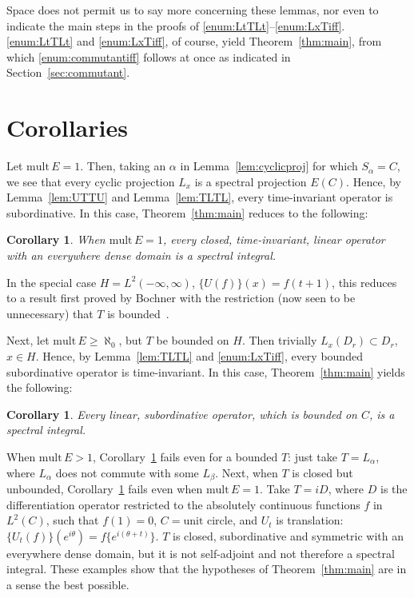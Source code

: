 \documentclass[12pt]{article}
\newtheorem{corollary}[theorem]{Corollary}
\theoremstyle{definition}
\begin{document}
Space does not permit us to say more concerning these lemmas, nor even to indicate the main steps in the proofs of \ref{enum:LtTLt}--\ref{enum:LxTiff}. \ref{enum:LtTLt} and \ref{enum:LxTiff}, of course, yield Theorem~\ref{thm:main}, from which \ref{enum:commutantiff} follows at once as indicated in Section~\ref{sec:commutant}.

\section{Corollaries}

Let $\mathrm{mult}\, E = 1$. Then, taking an $\alpha$ in Lemma~\ref{lem:cyclicproj} for which $S_\alpha = C$, we see that every cyclic projection $L_x$ is a spectral projection $E(C)$. Hence, by Lemma~\ref{lem:UTTU} and Lemma~\ref{lem:TLTL}, every time-invariant operator is subordinative. In this case, Theorem~\ref{thm:main} reduces to the following:

\begin{corollary}\label{cor:mult1}
When $\mathrm{mult}\, E = 1$, every closed, time-invariant, linear operator with an everywhere dense domain is a spectral integral.
\end{corollary}

In the special case $H = L^2(-\infty, \infty)$, $\{U(f)\}(x) = f(t+1)$, this reduces to a result first proved by Bochner with the restriction (now seen to be unnecessary) that $T$ is bounded~\cite{bochner1929}.

Next, let $\mathrm{mult}\, E \geq \aleph_0$, but $T$ be bounded on $H$. Then trivially $L_x(D_r) \subset D_r$, $x \in H$. Hence, by Lemma~\ref{lem:TLTL} and \ref{enum:LxTiff}, every bounded subordinative operator is time-invariant. In this case, Theorem~\ref{thm:main} yields the following:

\begin{corollary}\label{cor:boundedsub}
Every linear, subordinative operator, which is bounded on $C$, is a spectral integral.
\end{corollary}

When $\mathrm{mult}\, E > 1$, Corollary~\ref{cor:mult1} fails even for a bounded $T$: just take $T = L_\alpha$, where $L_\alpha$ does not commute with some $L_\beta$. Next, when $T$ is closed but unbounded, Corollary~\ref{cor:boundedsub} fails even when $\mathrm{mult}\, E = 1$. Take $T = iD$, where $D$ is the differentiation operator restricted to the absolutely continuous functions $f$ in $L^2(C)$, such that $f(1) = 0$, $C = \text{unit circle}$, and $U_t$ is translation: $\{U_t(f)\}(e^{i\theta}) = f\{e^{i(\theta + t)}\}$. $T$ is closed, subordinative and symmetric with an everywhere dense domain, but it is not self-adjoint and not therefore a spectral integral. These examples show that the hypotheses of Theorem~\ref{thm:main} are in a sense the best possible.
\end{document}
